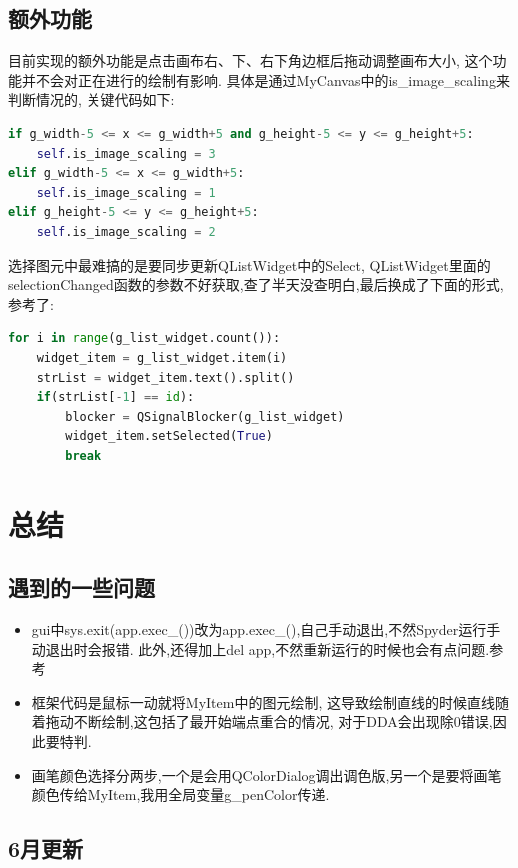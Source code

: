 \documentclass[a4paper,UTF8]{article}
\theoremstyle{definition}
\begin{document}
\subsection{额外功能}
目前实现的额外功能是点击画布右、下、右下角边框后拖动调整画布大小, 这个功能并不会对正在进行的绘制有影响. 具体是通过MyCanvas中的is\_image\_scaling来判断情况的, 关键代码如下:\\
\begin{lstlisting}[language={python}]
if g_width-5 <= x <= g_width+5 and g_height-5 <= y <= g_height+5:
    self.is_image_scaling = 3  
elif g_width-5 <= x <= g_width+5:  
    self.is_image_scaling = 1  
elif g_height-5 <= y <= g_height+5:  
    self.is_image_scaling = 2
\end{lstlisting}
选择图元中最难搞的是要同步更新QListWidget中的Select, QListWidget里面的selectionChanged函数的参数不好获取,查了半天没查明白,最后换成了下面的形式,参考了\cite{choose}:\\
\begin{lstlisting}[language={python}]
for i in range(g_list_widget.count()):
    widget_item = g_list_widget.item(i)
    strList = widget_item.text().split()
    if(strList[-1] == id):
        blocker = QSignalBlocker(g_list_widget)
        widget_item.setSelected(True)
        break
\end{lstlisting}
\section{总结}
\subsection{遇到的一些问题}
\begin{itemize}
	\item gui中sys.exit(app.exec\_())改为app.exec\_(),自己手动退出,不然Spyder运行手动退出时会报错.
	此外,还得加上del app,不然重新运行的时候也会有点问题.参考\cite{exit}
	\item 框架代码是鼠标一动就将MyItem中的图元绘制,
	这导致绘制直线的时候直线随着拖动不断绘制,这包括了最开始端点重合的情况,
	对于DDA会出现除0错误,因此要特判.
	\item 画笔颜色选择分两步,一个是会用QColorDialog调出调色版,另一个是要将画笔颜色传给MyItem,我用全局变量g\_penColor传递.
\end{itemize}
\subsection{6月更新}
\end{document}
